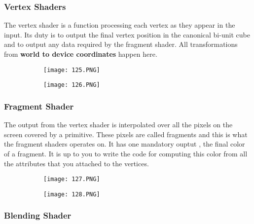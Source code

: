 \documentclass{article}
\begin{document}
\subsubsection{Vertex Shaders}

The vertex shader is a function processing each vertex as they appear in the input.
Its duty is to output the final vertex position in the canonical bi-unit cube and to output any data required by the fragment shader.
All transformations from \textbf{world to device coordinates} happen here.


\begin{figure}[ht!]
  \centering
  \begin{subfigure}[b]{0.29\linewidth}
    \texttt{[image: 125.PNG]}
  \end{subfigure}
  \begin{subfigure}[b]{0.7\textwidth}
         \centering
         \texttt{[image: 126.PNG]}
     \end{subfigure}
\end{figure}


\vspace{80mm}

\subsubsection{Fragment Shader}


The output from the vertex shader is interpolated over all the pixels on the screen covered by a primitive.
These pixels are called fragments and this is what the fragment shaders operates on.
It has one mandatory ouptut , the final color of a fragment. It is up to you to write the code for computing this color from all the attributes that you attached to the vertices.


\begin{figure}[ht!]
  \centering
  \begin{subfigure}[b]{0.39\linewidth}
    \texttt{[image: 127.PNG]}
  \end{subfigure}
  \begin{subfigure}[b]{0.6\textwidth}
         \centering
         \texttt{[image: 128.PNG]}
     \end{subfigure}
\end{figure}


\subsubsection{Blending Shader}
\end{document}
